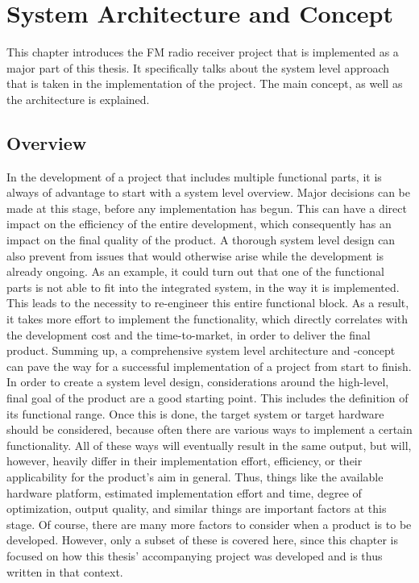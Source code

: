 \chapter{System Architecture and Concept}
\label{cha:SystemArchitectureAndConcept}

This chapter introduces the FM radio receiver project that is implemented as a major part of this thesis.
It specifically talks about the system level approach that is taken in the implementation of the project.
The main concept, as well as the architecture is explained.

\section{Overview}

In the development of a project that includes multiple functional parts, it is always of advantage to start with a system level overview.
Major decisions can be made at this stage, before any implementation has begun.
This can have a direct impact on the efficiency of the entire development, which consequently has an impact on the final quality of the product.
A thorough system level design can also prevent from issues that would otherwise arise while the development is already ongoing.
As an example, it could turn out that one of the functional parts is not able to fit into the integrated system, in the way it is implemented.
This leads to the necessity to re-engineer this entire functional block.
As a result, it takes more effort to implement the functionality, which directly correlates with the development cost and the time-to-market, in order to deliver the final product.
Summing up, a comprehensive system level architecture and -concept can pave the way for a successful implementation of a project from start to finish.\\

In order to create a system level design, considerations around the high-level, final goal of the product are a good starting point.
This includes the definition of its functional range.
Once this is done, the target system or target hardware should be considered, because often there are various ways to implement a certain functionality.
All of these ways will eventually result in the same output, but will, however, heavily differ in their implementation effort, efficiency, or their applicability for the product's aim in general.
Thus, things like the available hardware platform, estimated implementation effort and time, degree of optimization, output quality, and similar things are important factors at this stage.
Of course, there are many more factors to consider when a product is to be developed.
However, only a subset of these is covered here, since this chapter is focused on how this thesis' accompanying project was developed and is thus written in that context.\\

